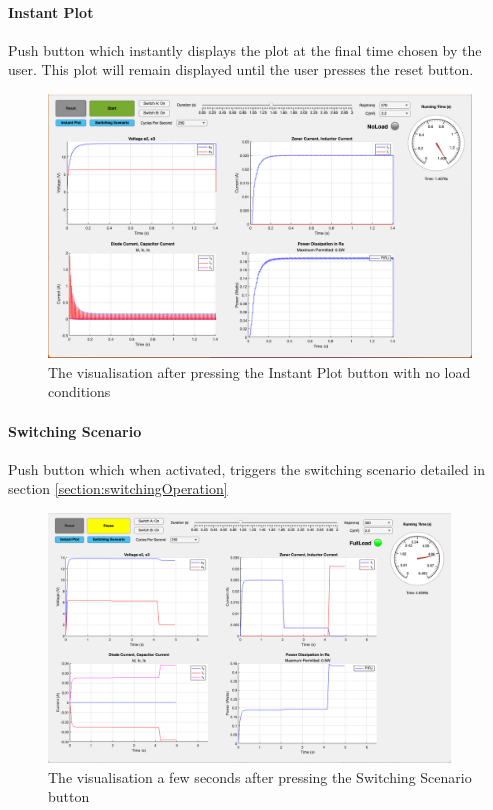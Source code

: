\paragraph{Instant Plot} Push button which instantly displays the plot at the final time chosen by the user. This plot will remain displayed until the user presses the reset button. 
\begin{figure}[H]
     \centering
     \includegraphics[width=\textwidth]{graphics/visualisation/no_load_instant_plot}
     \caption{The visualisation after pressing the Instant Plot button with no load conditions}
\end{figure}

\paragraph{Switching Scenario} Push button which when activated, triggers the switching scenario detailed in section \ref{section:switchingOperation}

\begin{figure}[H]
   \centering
   \includegraphics[width=0.95\textwidth]{graphics/visualisation/switching_3}
   \caption{The visualisation a few seconds after pressing the Switching Scenario button}
\end{figure}

